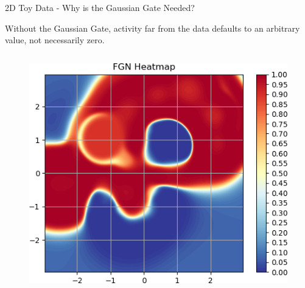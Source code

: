 \documentclass{beamer}
\begin{document}
\begin{frame}{2D Toy Data - Why is the Gaussian Gate Needed?}
    
    \vspace{-1mm}
    
    \begin{block}{}
        Without the Gaussian Gate, activity far from the data defaults to an arbitrary value, not necessarily zero. 
    \end{block}
    
    \begin{columns}
    \begin{column}{.48\textwidth}
    \begin{figure}
        \centering
        \includegraphics[width=1.\textwidth]{images/2D-network-toy/no-gate.png}
    \end{figure}
    \end{column}
    

\end{columns}
\end{frame}
\end{document}
